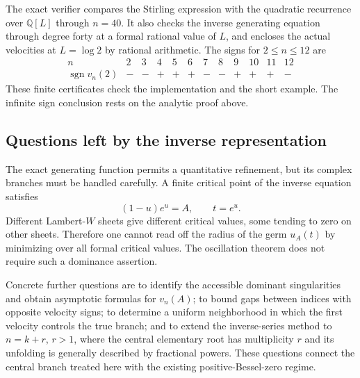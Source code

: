 The exact verifier compares the Stirling expression with the quadratic
recurrence over $\mathbb Q[L]$ through $n=40$.  It also checks the inverse
generating equation through degree forty at a formal rational value of
$L$, and encloses the actual velocities at $L=\log2$ by rational
arithmetic.  The signs for $2\leq n\leq12$ are
\[
\begin{array}{c|rrrrrrrrrrr}
 n&2&3&4&5&6&7&8&9&10&11&12\\ \hline
 \operatorname{sgn}v_n(2)&-&-&+&+&+&-&-&+&+&+&-
\end{array}
\]
These finite certificates check the implementation and the short example.
The infinite sign conclusion rests on the analytic proof above.

\subsection{Questions left by the inverse representation}
\label{diag:subsec:questions}

The exact generating function permits a quantitative refinement, but its
complex branches must be handled carefully.  A finite critical point of
the inverse equation satisfies
\begin{equation}\label{diag:eq:critical-values}
 (1-u)e^u=A,\qquad t=e^u.
\end{equation}
Different Lambert-$W$ sheets give different critical values, some tending
to zero on other sheets.  Therefore one cannot read off the radius of
the germ $u_A(t)$ by minimizing over all formal critical values.  The
oscillation theorem does not require such a dominance assertion.

Concrete further questions are to identify the accessible dominant
singularities and obtain asymptotic formulas for $v_n(A)$; to bound gaps
between indices with opposite velocity signs; to determine a uniform
neighborhood in which the first velocity controls the true branch; and
to extend the inverse-series method to $n=k+r$, $r>1$, where the central
elementary root has multiplicity $r$ and its unfolding is generally
described by fractional powers.  These questions connect the central
branch treated here with the existing positive-Bessel-zero regime.
